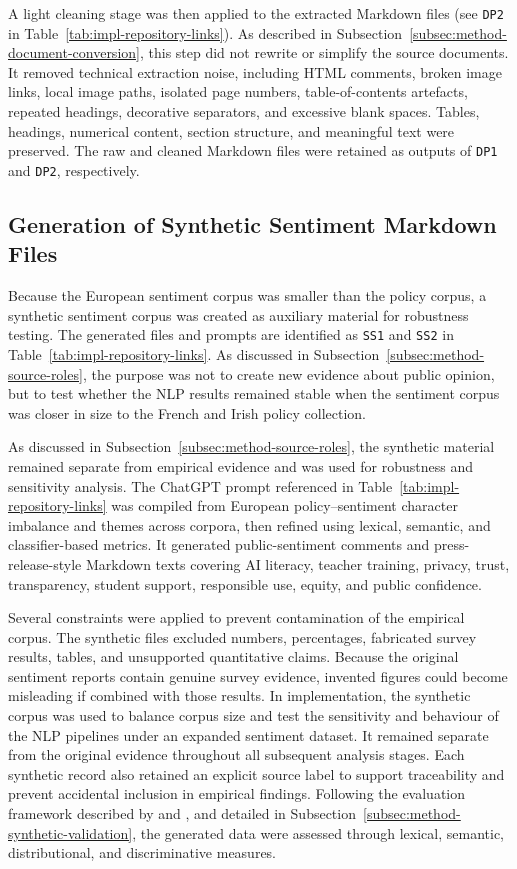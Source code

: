 A light cleaning stage was then applied to the extracted Markdown files (see
\texttt{DP2} in Table~\ref{tab:impl-repository-links}). As described in
Subsection~\ref{subsec:method-document-conversion}, this step did not rewrite or
simplify the source documents. It removed technical extraction noise, including
HTML comments, broken image links, local image paths, isolated page numbers,
table-of-contents artefacts, repeated headings, decorative separators, and excessive
blank spaces. Tables, headings, numerical content, section structure, and meaningful
text were preserved. The raw and cleaned Markdown files were retained as outputs of
\texttt{DP1} and \texttt{DP2}, respectively.

\subsection{Generation of Synthetic Sentiment Markdown Files}

Because the European sentiment corpus was smaller than the policy corpus, a
synthetic sentiment corpus was created as auxiliary material for robustness testing.
The generated files and prompts are identified as \texttt{SS1} and \texttt{SS2} in
Table~\ref{tab:impl-repository-links}. As discussed in
Subsection~\ref{subsec:method-source-roles}, the purpose was not to create new
evidence about public opinion, but to test whether the NLP results remained stable
when the sentiment corpus was closer in size to the French and Irish policy
collection.

As discussed in Subsection~\ref{subsec:method-source-roles}, the synthetic material
remained separate from empirical evidence and was used for robustness and sensitivity
analysis. {\color{blue}The ChatGPT prompt referenced in
Table~\ref{tab:impl-repository-links} was compiled from European policy--sentiment
character imbalance and themes across corpora, then refined using lexical, semantic,
and classifier-based metrics}. It generated public-sentiment comments and
press-release-style Markdown texts covering AI literacy, teacher training, privacy,
trust, transparency, student support, responsible use, equity, and public confidence.

Several constraints were applied to prevent contamination of the empirical corpus.
The synthetic files excluded numbers, percentages, fabricated survey results, tables,
and unsupported quantitative claims. Because the original sentiment reports contain
genuine survey evidence, invented figures could become misleading if combined with
those results. In implementation, the synthetic corpus was used to balance corpus
size and test the sensitivity and behaviour of the NLP pipelines under an expanded
sentiment dataset. It remained separate from the original evidence throughout all
subsequent analysis stages. Each synthetic record also retained an explicit source
label to support traceability and prevent accidental inclusion in empirical findings.
Following the evaluation framework described by \cite{chim2025evaluating} and
\cite{tari2026privacy}, and detailed in
Subsection~\ref{subsec:method-synthetic-validation}, the generated data were assessed
through lexical, semantic, distributional, and discriminative measures.

